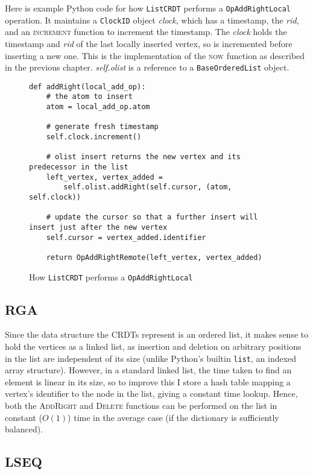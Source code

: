 \documentclass[diss.tex]{subfiles}
\begin{document}
Here is example Python code for how \texttt{ListCRDT} performs a \texttt{OpAddRightLocal} operation. It maintains a \texttt{ClockID} object \textit{clock}, which has a timestamp, the \textit{rid}, and an \textsc{increment} function to increment the timestamp. The \textit{clock} holds the timestamp and \textit{rid} of the last locally inserted vertex, so is incremented before inserting a new one. This is the implementation of the \textsc{now} function as described in the previous chapter. \textit{self.olist} is a reference to a \texttt{BaseOrderedList} object.

\begin{figure}[H]
\begin{lstlisting}
def addRight(local_add_op):
	# the atom to insert
	atom = local_add_op.atom
	
	# generate fresh timestamp
	self.clock.increment()

	# olist insert returns the new vertex and its predecessor in the list
	left_vertex, vertex_added = 
		self.olist.addRight(self.cursor, (atom, self.clock))

	# update the cursor so that a further insert will insert just after the new vertex
	self.cursor = vertex_added.identifier

	return OpAddRightRemote(left_vertex, vertex_added)
\end{lstlisting}
\caption{How \texttt{ListCRDT} performs a \texttt{OpAddRightLocal}}
\label{fig:listcrdtaddright}
\end{figure}

\subsection{RGA}
Since the data structure the CRDTs represent is an ordered list, it makes sense to hold the vertices as a linked list, as insertion and deletion on arbitrary positions in the list are independent of its size (unlike Python's builtin \texttt{list}, an indexed array structure). However, in a standard linked list, the time taken to find an element is linear in its size, so to improve this I store a hash table mapping a vertex's identifier to the node in the list, giving a constant time lookup. Hence, both the \textsc{AddRight} and \textsc{Delete} functions can be performed on the list in constant ($O(1)$) time in the average case (if the dictionary is sufficiently balanced).

\subsection{LSEQ}
\end{document}
